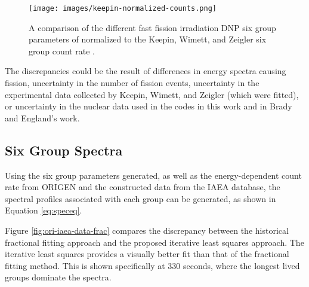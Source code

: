 \documentclass{style/nseJournal}
\begin{document}
\begin{figure}[]
\centering
\texttt{[image: images/keepin-normalized-counts.png]}
\caption{A comparison of the different fast fission irradiation DNP six group parameters of  normalized to the Keepin, Wimett, and Zeigler six group count rate \cite{KEEPIN1957IN2}.}
\label{fig:keepnorm}
\end{figure}

The discrepancies could be the result of differences in energy spectra causing fission, uncertainty in the number of fission events, uncertainty in the experimental data collected by Keepin, Wimett, and Zeigler (which were fitted), or uncertainty in the nuclear data used in the codes in this work and in Brady and England's work.

\subsection{Six Group Spectra}

Using the six group parameters generated, as well as the energy-dependent count rate from ORIGEN and the constructed data from the IAEA database, the spectral profiles associated with each group can be generated, as shown in Equation \eqref{eq:speceq}.

Figure \ref{fig:ori-iaea-data-frac} compares the discrepancy between the historical fractional fitting approach and the proposed  iterative least squares approach.
The iterative least squares provides a visually better fit than that of the fractional fitting method.
This is shown specifically at 330 seconds, where the longest lived groups dominate the spectra.
\end{document}
